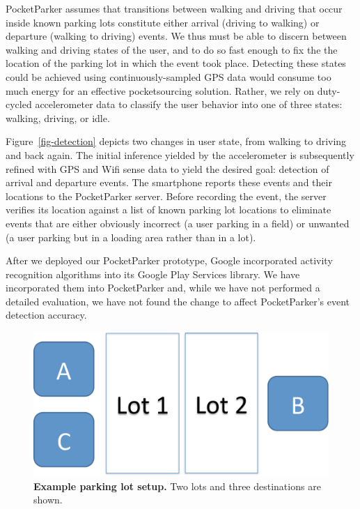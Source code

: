 \documentclass{sigchi}
\begin{document}
PocketParker assumes that transitions between walking and driving that occur
inside known parking lots constitute either arrival (driving to walking) or
departure (walking to driving) events.  We thus must be able to discern
between walking and driving states of the user, and to do so fast enough to
fix the the location of the parking lot in which the event took place.
Detecting these states could be achieved using continuously-sampled GPS data
would consume too much energy for an effective pocketsourcing solution.
Rather, we rely on duty-cycled accelerometer data to classify the user
behavior into one of three states: walking, driving, or idle.

Figure~\ref{fig-detection} depicts two changes in user state, from walking to
driving and back again.  The initial inference yielded by the accelerometer
is subsequently refined with GPS and Wifi sense data to yield the desired
goal: detection of arrival and departure events.  The smartphone reports
these events and their locations to the PocketParker server. Before recording
the event, the server verifies its location against a list of known parking
lot locations to eliminate events that are either obviously incorrect (a user
parking in a field) or unwanted (a user parking but in a loading area rather
than in a lot).

After we deployed our PocketParker prototype, Google incorporated activity
recognition algorithms into its Google Play Services library. We have
incorporated them into PocketParker and, while we have not performed a
detailed evaluation, we have not found the change to affect PocketParker's
event detection accuracy.


\begin{figure}
\centering
\includegraphics[width=0.6\columnwidth]{./figures/CartoonLot.pdf}

\caption{\textbf{Example parking lot setup.} Two lots and three
destinations are shown.}

\label{fig-lots}
\end{figure}
\end{document}
